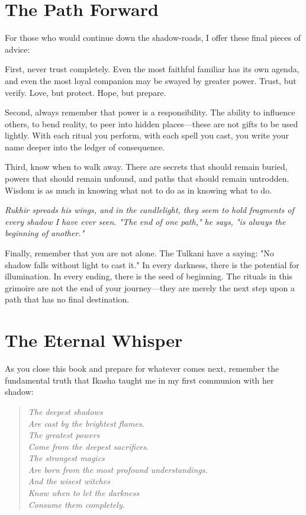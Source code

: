 \documentclass[12pt,twoside]{book}
\newcommand{\shadow}[1]{\textit{#1}}
\begin{document}
\section*{The Path Forward}

For those who would continue down the shadow-roads, I offer these final pieces of advice:

First, never trust completely. Even the most faithful familiar has its own agenda, and even the most loyal companion may be swayed by greater power. Trust, but verify. Love, but protect. Hope, but prepare.

Second, always remember that power is a responsibility. The ability to influence others, to bend reality, to peer into hidden places—these are not gifts to be used lightly. With each ritual you perform, with each spell you cast, you write your name deeper into the ledger of consequence.

Third, know when to walk away. There are secrets that should remain buried, powers that should remain unfound, and paths that should remain untrodden. Wisdom is as much in knowing what not to do as in knowing what to do.

\shadow{Rukhir spreads his wings, and in the candlelight, they seem to hold fragments of every shadow I have ever seen. "The end of one path," he says, "is always the beginning of another."}

Finally, remember that you are not alone. The Tulkani have a saying: "No shadow falls without light to cast it." In every darkness, there is the potential for illumination. In every ending, there is the seed of beginning. The rituals in this grimoire are not the end of your journey—they are merely the next step upon a path that has no final destination.

\section*{The Eternal Whisper}

As you close this book and prepare for whatever comes next, remember the fundamental truth that Ikasha taught me in my first communion with her shadow:

\begin{verse}
\textit{The deepest shadows} \\
\textit{Are cast by the brightest flames.} \\
\textit{The greatest powers} \\
\textit{Come from the deepest sacrifices.} \\
\textit{The strongest magics} \\
\textit{Are born from the most profound understandings.} \\
\textit{And the wisest witches} \\
\textit{Know when to let the darkness} \\
\textit{Consume them completely.}
\end{verse}
\end{document}
